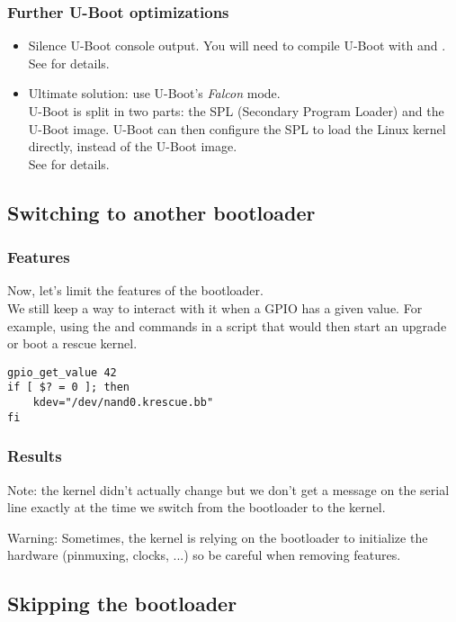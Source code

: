 \begin{frame}
\frametitle{Further U-Boot optimizations}
\begin{itemize}
\item Silence U-Boot console output. You will need to compile
      U-Boot with  and
      .\\
      See  for details.
\item Ultimate solution: use U-Boot's {\em Falcon} mode.\\
      U-Boot is split in two parts: the SPL (Secondary Program Loader)
      and the U-Boot image. U-Boot can then configure the SPL to load
      the Linux kernel directly, instead of the U-Boot image.\\
      See  for details.
\end{itemize}
\end{frame}

\subsection{Switching to another bootloader}

\begin{frame}[fragile]
\frametitle{Features}
Now, let's limit the features of the bootloader.\\
We still keep a way to interact with it when a GPIO has a given value.
For example, using the  and
 commands in a script that would then start an
upgrade or boot a rescue kernel.
\begin{block}{}
\begin{verbatim}
gpio_get_value 42
if [ $? = 0 ]; then
    kdev="/dev/nand0.krescue.bb"
fi
\end{verbatim}
\end{block}
\end{frame}

\begin{frame}
\frametitle{Results}
Note: the kernel didn't actually change but we don't get a message on
the serial line exactly at the time we switch from the bootloader to
the kernel.

Warning: Sometimes, the kernel is relying on the bootloader to
initialize the hardware (pinmuxing, clocks, ...) so be careful when
removing features.
\end{frame}

\subsection{Skipping the bootloader}

